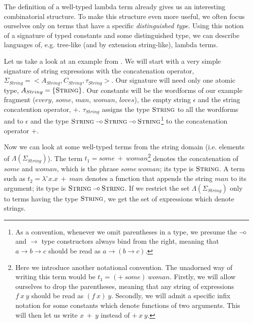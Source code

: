 \documentclass{article}
\def\limp {\mathbin{{-}\mkern-3.5mu{\circ}}}
\begin{document}
The definition of a well-typed lambda term already gives us an
interesting combinatorial structure. To make this structure even more
useful, we often focus ourselves only on terms that have a specific
\emph{distinguished type}. Using this notion of a signature of typed
constants and some distinguished type, we can describe languages of,
e.g. tree-like (and by extension string-like), lambda terms.

Let us take a look at an example from
\cite{pogodalla2007generalizing}. We will start with a very simple
signature of string expressions with the concatenation operator,
$\Sigma_{String} = \mathopen{<}A_{String}, C_{String},
\tau_{String}\mathclose{>}$. Our signature will need only one atomic
type, $A_{String} = \{\textsc{String}\}$. Our constants will be the
wordforms of our example fragment ($every$, $some$, $man$, $woman$,
$loves$), the empty string $\epsilon$ and the string concatention
operator, $+$. $\tau_{String}$ assigns the type $\textsc{String}$ to all
the wordforms and to $\epsilon$ and the type $\textsc{String} \limp
\textsc{String} \limp \textsc{String}$\footnote{As a convention,
  whenever we omit parentheses in a type, we presume the $\limp$ and
  $\to$ type constructors always bind from the right, meaning that $a
  \to b \to c$ should be read as $a \to (b \to c)$.}
to the concatenation operator $+$.

Now we can look at some well-typed terms from the string domain
(i.e. elements of $\Lambda(\Sigma_{String})$). The term $t_1 =
some\ +\ woman$\footnote{Here we introduce another notational
  convention. The unadorned way of writing this term would be $t_1 =
  (+\ some)\ woman$. Firstly, we will allow ourselves to drop the
  parentheses, meaning that any string of expressions $f\ x\ y$ should
  be read as $(f\ x)\ y$. Secondly, we will admit a specific infix
  notation for some constants which denote functions of two
  arguments. This will then let us write $x\ +\ y$ instead of
  $+\ x\ y$.} denotes the concatenation of $some$ and $woman$, which is
the phrase $some\ woman$; its type is $\textsc{String}$. A term such as
$t_2 = \lambda^{\circ} x. x\ +\ man$ denotes a function that appends the
string $man$ to its argument; its type is $\textsc{String} \limp
\textsc{String}$. If we restrict the set $\Lambda(\Sigma_{String})$ only
to terms having the type $\textsc{String}$, we get the set of
expressions which denote strings.
\end{document}
